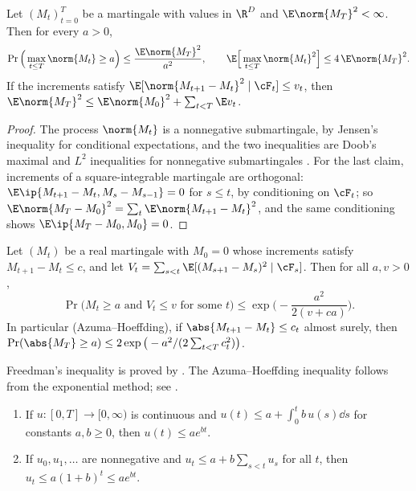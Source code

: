 \begin{refsection}
\begin{lemma}\label{lem:toolkit:doob}
Let $(M_t)_{t=0}^T$ be a martingale with values in $\R^D$ and $\E\norm{M_T}^2<\infty$. Then for every $a>0$,
\[
  \Pr\Big(\max_{t\le T}\norm{M_t}\ge a\Big)\le\frac{\E\norm{M_T}^2}{a^2},\qquad \E\Big[\max_{t\le T}\norm{M_t}^2\Big]\le4\,\E\norm{M_T}^2 .
\]
If the increments satisfy $\E[\norm{M_{t+1}-M_t}^2\mid\cF_t]\le v_t$, then $\E\norm{M_T}^2\le\E\norm{M_0}^2+\sum_{t<T}\E v_t$.
\end{lemma}

\begin{proof}
The process $\norm{M_t}$ is a nonnegative submartingale, by Jensen's inequality for conditional expectations, and the two inequalities are Doob's maximal and $L^2$ inequalities for nonnegative submartingales \parencite{Williams1991}. For the last claim, increments of a square-integrable martingale are orthogonal: $\E\ip{M_{t+1}-M_t,M_s-M_{s-1}}=0$ for $s\le t$, by conditioning on $\cF_t$; so $\E\norm{M_T-M_0}^2=\sum_t\E\norm{M_{t+1}-M_t}^2$, and the same conditioning shows $\E\ip{M_T-M_0,M_0}=0$.
\end{proof}

\begin{theorem}\label{thm:toolkit:freedman}
Let $(M_t)$ be a real martingale with $M_0=0$ whose increments satisfy $M_{t+1}-M_t\le c$, and let $V_t=\sum_{s<t}\E[(M_{s+1}-M_s)^2\mid\cF_s]$. Then for all $a,v>0$,
\[
  \Pr\big(M_t\ge a\text{ and }V_t\le v\text{ for some }t\big)\le\exp\Big(-\frac{a^2}{2(v+ca)}\Big).
\]
In particular (Azuma--Hoeffding), if $\abs{M_{t+1}-M_t}\le c_t$ almost surely, then $\Pr(\abs{M_T}\ge a)\le2\exp\big(-a^2/(2\sum_{t<T}c_t^2)\big)$.
\end{theorem}

Freedman's inequality is proved by \textcite{Freedman1975}. The Azuma--Hoeffding inequality follows from the exponential method; see \textcite{BoucheronLugosiMassart2013}.

\begin{theorem}\label{thm:toolkit:gronwall}
\begin{enumerate}
\item If $u\colon[0,T]\to[0,\infty)$ is continuous and $u(t)\le a+\int_0^tb\,u(s)\dd s$ for constants $a,b\ge0$, then $u(t)\le ae^{bt}$.
\item If $u_0,u_1,\dots$ are nonnegative and $u_t\le a+b\sum_{s<t}u_s$ for all $t$, then $u_t\le a(1+b)^t\le ae^{bt}$.
\end{enumerate}
\end{theorem}


\end{refsection}
